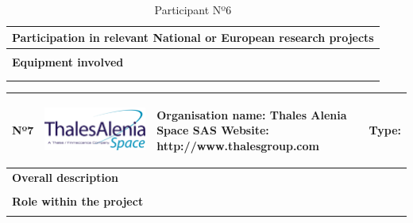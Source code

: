 \begin{longtable}[H]{|p{0.7cm}|p{4cm}|p{7cm}|p{1.3cm}|}
	\multicolumn{4}{|p{13cm}|}{\textbf{Participation in relevant National or European research projects}}  \\ \hline
	
	\multicolumn{4}{|p{13cm}|}{}  \\ \hline
	
	\multicolumn{4}{|p{13cm}|}{\textbf{Equipment involved}}  \\ \hline
	
	\multicolumn{4}{|p{13cm}|}{}  \\ \hline
	\caption{Participant Nº6}
\end{longtable}

\begin{longtable}[H]{|p{0.7cm}|p{4cm}|p{7cm}|p{1.3cm}|}
	\hline
	\begin{center} Nº7 \end{center} & \begin{center} \includegraphics[scale=0.25]{./logos/Thales_Alenia_Space_Belgium_logo} \end{center} & \begin{center} \textbf{Organisation name:} Thales Alenia Space SAS \newline \textbf{Website:} http://www.thalesgroup.com \end{center} & \begin{center} Type: \end{center} \\ \hline
	
	\multicolumn{4}{|p{13cm}|}{\textbf{Overall description}}  \\ \hline
	
	\multicolumn{4}{|p{13cm}|}{}  \\ \hline
	
	\multicolumn{4}{|p{13cm}|}{\textbf{Role within the project}}   \\ \hline
	
	\multicolumn{4}{|p{13cm}|}{}  \\ \hline
	

\end{longtable}
